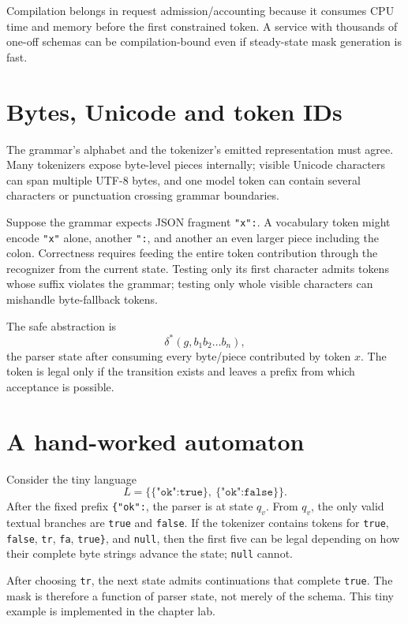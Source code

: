 Compilation belongs in request admission/accounting because it consumes CPU time and
memory before the first constrained token. A service with thousands of one-off schemas
can be compilation-bound even if steady-state mask generation is fast.

\section{Bytes, Unicode and token IDs}

The grammar's alphabet and the tokenizer's emitted representation must agree. Many
tokenizers expose byte-level pieces internally; visible Unicode characters can span
multiple UTF-8 bytes, and one model token can contain several characters or punctuation
crossing grammar boundaries.

Suppose the grammar expects JSON fragment \texttt{"x":}. A vocabulary token might
encode \texttt{"x"} alone, another \texttt{":}, and another an even larger piece
including the colon. Correctness requires feeding the entire token contribution
through the recognizer from the current state. Testing only its first character admits
tokens whose suffix violates the grammar; testing only whole visible characters can
mishandle byte-fallback tokens.

The safe abstraction is
\[
\delta^*(g,b_1b_2\ldots b_n),
\]
the parser state after consuming every byte/piece contributed by token $x$. The token
is legal only if the transition exists and leaves a prefix from which acceptance is
possible.

\section{A hand-worked automaton}

Consider the tiny language
\[
L=\{\texttt{\{"ok":true\}},\ \texttt{\{"ok":false\}}\}.
\]
After the fixed prefix \texttt{\{"ok":}, the parser is at state $q_v$. From $q_v$,
the only valid textual branches are \texttt{true} and \texttt{false}. If the tokenizer
contains tokens for \texttt{true}, \texttt{false}, \texttt{tr}, \texttt{fa},
\texttt{true\}}, and \texttt{null}, then the first five can be legal depending on how
their complete byte strings advance the state; \texttt{null} cannot.

After choosing \texttt{tr}, the next state admits continuations that complete
\texttt{true}. The mask is therefore a function of parser state, not merely of the
schema. This tiny example is implemented in the chapter lab.


